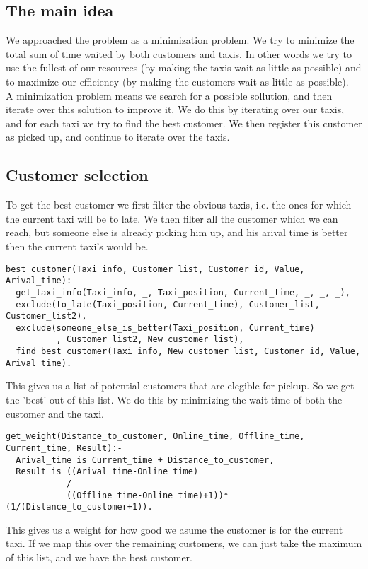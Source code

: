 \subsection{The main idea}
We approached the problem as a minimization problem. We try to minimize the total sum of time waited by both customers and taxis. In other words we try to use the fullest of our resources (by making the taxis wait as little as possible) and to maximize our efficiency (by making the customers wait as little as possible).\\
A minimization problem means we search for a possible sollution, and then iterate over this solution to improve it. We do this by iterating over our taxis, and for each taxi we try to find the best customer. We then register this customer as picked up, and continue to iterate over the taxis.
\subsection{Customer selection}
To get the best customer we first filter the obvious taxis, i.e. the ones for which the current taxi will be to late. We then filter all the customer which we can reach, but someone else is already picking him up, and his arival time is better then the current taxi's would be.\\
\begin{lstlisting}
best_customer(Taxi_info, Customer_list, Customer_id, Value, Arival_time):-
  get_taxi_info(Taxi_info, _, Taxi_position, Current_time, _, _, _),
  exclude(to_late(Taxi_position, Current_time), Customer_list, Customer_list2),
  exclude(someone_else_is_better(Taxi_position, Current_time)
          , Customer_list2, New_customer_list),
  find_best_customer(Taxi_info, New_customer_list, Customer_id, Value, Arival_time).
\end{lstlisting}
This gives us a list of potential customers that are elegible for pickup. So we get the 'best' out of this list.
We do this by minimizing the wait time of both the customer and the taxi. 
\begin{lstlisting}
get_weight(Distance_to_customer, Online_time, Offline_time, Current_time, Result):-
  Arival_time is Current_time + Distance_to_customer,
  Result is ((Arival_time-Online_time)
            /
            ((Offline_time-Online_time)+1))*(1/(Distance_to_customer+1)).
\end{lstlisting}
This gives us a weight for how good we asume the customer is for the current taxi. If we map this over the remaining customers, we can just take the maximum of this list, and we have the best customer.
